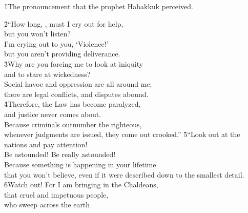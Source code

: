 


\v{1}The pronouncement that the prophet Habakkuk perceived.

\begin{poetry}
\poeml \v{2}``How long, , must I cry out for help, \\
\poeml but you won't listen? \\
\poeml I'm crying out to you, `Violence!' \\
\poemll    but you aren't providing deliverance. \\
\poeml \v{3}Why are you forcing me to look at iniquity \\
\poemll    and to stare at wickedness? \\
\poeml Social havoc and oppression are all around me; \\
\poemll    there are legal conflicts, and disputes abound. \\
\poeml \v{4}Therefore, the Law has become paralyzed, \\
\poemll    and justice never comes about. \\
\poeml Because criminals outnumber the righteous, \\
\poemll    whenever judgments are issued, they come out crooked.''
\poeml \v{5}``Look out at the nations and pay attention! \\
\poemll    Be astounded! Be really astounded! \\
\poeml Because something is happening in your lifetime \\
\poemll    that you won't believe, even if it were described down to the smallest detail. \\
\poeml \v{6}Watch out! For I am bringing in the Chaldeans, \\
\poemll    that cruel and impetuous people, \\
\poeml who sweep across the earth \\

\end{poetry}
